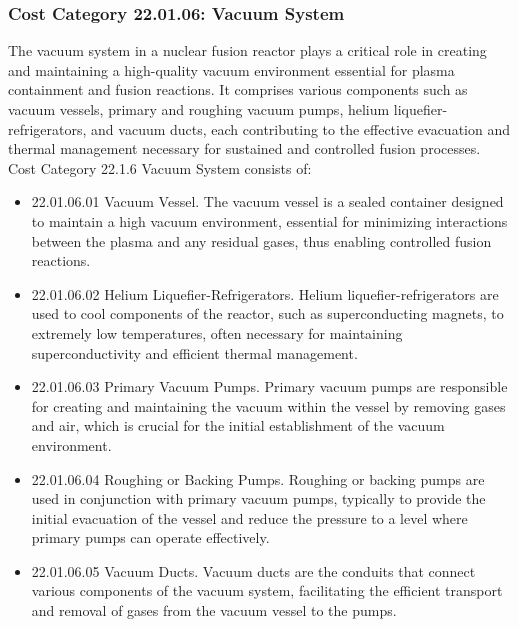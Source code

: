 
\subsubsection*{Cost Category 22.01.06: Vacuum System}

The vacuum system in a nuclear fusion reactor plays a critical role in creating and maintaining a high-quality vacuum environment essential for plasma containment and fusion reactions. It comprises various components such as vacuum vessels, primary and roughing vacuum pumps, helium liquefier-refrigerators, and vacuum ducts, each contributing to the effective evacuation and thermal management necessary for sustained and controlled fusion processes. Cost Category 22.1.6 Vacuum System consists of:  

\begin{itemize}
\item 22.01.06.01 Vacuum Vessel.  The vacuum vessel is a sealed container designed to maintain a high vacuum environment, essential for minimizing interactions between the plasma and any residual gases, thus enabling controlled fusion reactions.

\item 22.01.06.02 Helium Liquefier-Refrigerators. Helium liquefier-refrigerators are used to cool components of the reactor, such as superconducting magnets, to extremely low temperatures, often necessary for maintaining superconductivity and efficient thermal management.

\item 22.01.06.03 Primary Vacuum Pumps. Primary vacuum pumps are responsible for creating and maintaining the vacuum within the vessel by removing gases and air, which is crucial for the initial establishment of the vacuum environment.

\item 22.01.06.04 Roughing or Backing Pumps. Roughing or backing pumps are used in conjunction with primary vacuum pumps, typically to provide the initial evacuation of the vessel and reduce the pressure to a level where primary pumps can operate effectively.

\item 22.01.06.05 Vacuum Ducts. Vacuum ducts are the conduits that connect various components of the vacuum system, facilitating the efficient transport and removal of gases from the vacuum vessel to the pumps.
\end{itemize}

